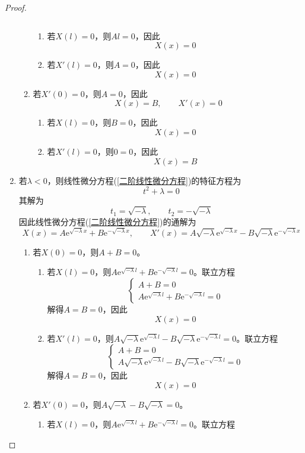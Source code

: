 \documentclass[lang = cn, scheme = chinese, thmcnt = section]{elegantbook}
\newcommand{\ee}[1]{\mathrm{e}^{#1}}   %
\begin{document}
\begin{proof}
\begin{enumerate}
\begin{enumerate}
$$			$$
			\begin{enumerate}
				\item 若$X(l)=0$，则$Al=0$，因此%
				$$
				X(x)=0
				$$
				\item 若$X'(l)=0$，则$A=0$，因此
				$$
				X(x)=0
				$$
			\end{enumerate}
			\item 若$X'(0)=0$，则$A=0$，因此
			$$
			X(x)=B,\qquad
			X'(x)=0
			$$
			\begin{enumerate}
				\item 若$X(l)=0$，则$B=0$，因此%
				$$
				X(x)=0
				$$
				\item 若$X'(l)=0$，则$0=0$，因此
				$$
				X(x)=B
				$$
			\end{enumerate}
		\end{enumerate}
		\item 若$\lambda<0$，则线性微分方程(\ref{二阶线性微分方程})的特征方程为%
		$$
		t^2+\lambda=0
		$$
		其解为%
		$$
		t_1=\sqrt{-\lambda},\qquad
		t_2=-\sqrt{-\lambda}
		$$
		因此线性微分方程(\ref{二阶线性微分方程})的通解为%
		$$
		X(x)=A\ee{\sqrt{-\lambda}x}+B\ee{-\sqrt{-\lambda}x},\qquad
		X'(x)=A\sqrt{-\lambda}\ee{\sqrt{-\lambda}x}-B\sqrt{-\lambda}\ee{-\sqrt{-\lambda}x}
		$$
		\begin{enumerate}
			\item 若$X(0)=0$，则$A+B=0$。
			\begin{enumerate}
				\item 若$X(l)=0$，则$A\ee{\sqrt{-\lambda}l}+B\ee{-\sqrt{-\lambda}l}=0$。联立方程%
				$$
				\begin{cases}
					A+B=0\\
					A\ee{\sqrt{-\lambda}l}+B\ee{-\sqrt{-\lambda}l}=0
				\end{cases}
				$$
				解得$A=B=0$，因此
				$$
				X(x)=0
				$$
				\item 若$X'(l)=0$，则$A\sqrt{-\lambda}\ee{\sqrt{-\lambda}l}-B\sqrt{-\lambda}\ee{-\sqrt{-\lambda}l}=0$。联立方程%
				$$
				\begin{cases}
					A+B=0\\
					A\sqrt{-\lambda}\ee{\sqrt{-\lambda}l}-B\sqrt{-\lambda}\ee{-\sqrt{-\lambda}l}=0
				\end{cases}
				$$
				解得$A=B=0$，因此
				$$
				X(x)=0
				$$
			\end{enumerate}
			\item 若$X'(0)=0$，则$A\sqrt{-\lambda}-B\sqrt{-\lambda}=0$。
			\begin{enumerate}
				\item 若$X(l)=0$，则$A\ee{\sqrt{-\lambda}l}+B\ee{-\sqrt{-\lambda}l}=0$。联立方程%

\end{enumerate}
\end{enumerate}
\end{enumerate}
\end{proof}
\end{document}
